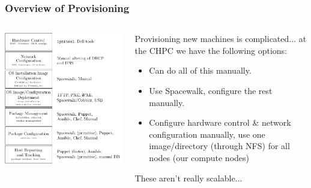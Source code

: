 \documentclass{beamer}
\begin{document}
\begin{frame}[fragile]
	\frametitle{Overview of Provisioning}
	\begin{columns}
		\begin{column}{0.5\textwidth}
			\includegraphics[width=\textwidth,height=\textheight-15mm,keepaspectratio]{provisioning_diagram}
		\end{column}

		\begin{column}{0.5\textwidth}
			Provisioning new machines is complicated... at the CHPC we have the following options:
			\begin{itemize}
				\item Can do all of this manually.
				\item Use Spacewalk, configure the rest manually.
				\item Configure hardware control \& network configuration manually, use one image/directory (through NFS) for all nodes (our compute nodes)
			\end{itemize}
			These aren't really scalable...
		\end{column}
	\end{columns}
\end{frame}
\end{document}
